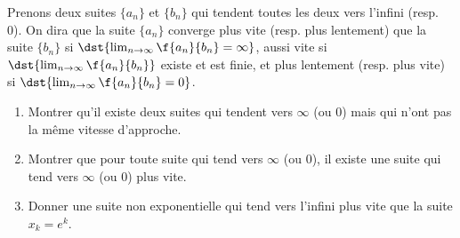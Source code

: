 
\begin{exercice}\label{exo0014}

Prenons deux suites $\{a_n\}$ et  $\{b_n\}$ qui tendent toutes les deux vers l'infini (resp. 0). On dira que la suite $\{a_n\}$ converge plus vite (resp. plus lentement) que la suite $\{b_n\}$ si $\dst{\lim_{n\rightarrow \infty}\f{a_n}{b_n} = \infty}$, aussi vite si $\dst{\lim_{n\rightarrow \infty}\f{a_n}{b_n} }$ existe et est finie, et plus lentement (resp. plus vite)  si $\dst{\lim_{n\rightarrow \infty}\f{a_n}{b_n} = 0}$.
\begin{enumerate}
	\item Montrer qu'il existe deux suites qui tendent vers $\infty$ (ou 0) mais qui n'ont pas la même  vitesse d'approche.
	\item Montrer que pour toute suite qui tend vers  $\infty$ (ou 0), il existe une suite qui tend vers  $\infty$ (ou 0) plus vite.
	\item Donner une suite non exponentielle qui tend vers l'infini plus vite que la suite $x_k = e^k$.
\end{enumerate}

\end{exercice}
